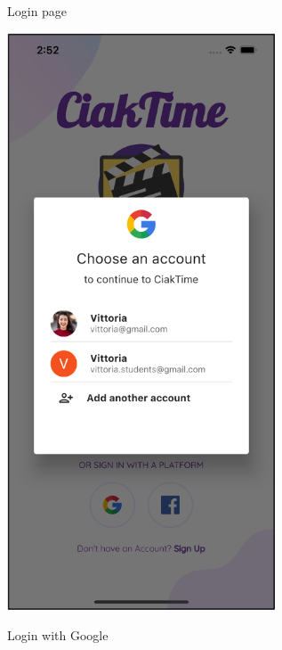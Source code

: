 \documentclass[12pt, a4paper]{article}
\numberwithin{figure}{section}
\begin{document}
\begin{center}
\begin{minipage}[t]{0.31\textwidth}
\begin{figure}[H]
			\caption{Login page}
		\end{figure}
	\end{minipage}
	\hspace{0.015\linewidth}
	\begin{minipage}[t]{0.31\textwidth}
		\begin{figure}[H]
			\centering
			\includegraphics[width=0.71\textwidth]{images/final/loginGoogle.png}\\
			\caption{Login with Google}
		\end{figure}
	\end{minipage}
	\hspace{0.015\linewidth}
	\begin{minipage}[t]{0.32\textwidth}
		\begin{figure}[H]

\end{figure}
\end{minipage}
\end{center}
\end{document}
